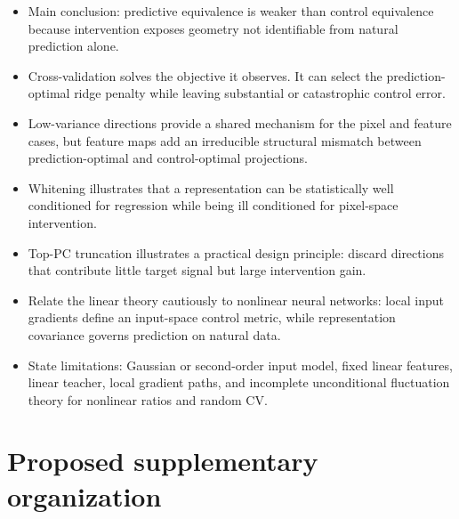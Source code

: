 \documentclass[11pt]{article}
\begin{document}
\begin{itemize}
  \item Main conclusion: predictive equivalence is weaker than control
        equivalence because intervention exposes geometry not identifiable
        from natural prediction alone.
  \item Cross-validation solves the objective it observes. It can select the
        prediction-optimal ridge penalty while leaving substantial or
        catastrophic control error.
  \item Low-variance directions provide a shared mechanism for the pixel and
        feature cases, but feature maps add an irreducible structural mismatch
        between prediction-optimal and control-optimal projections.
  \item Whitening illustrates that a representation can be statistically
        well conditioned for regression while being ill conditioned for
        pixel-space intervention.
  \item Top-PC truncation illustrates a practical design principle: discard
        directions that contribute little target signal but large intervention
        gain.
  \item Relate the linear theory cautiously to nonlinear neural networks:
        local input gradients define an input-space control metric, while
        representation covariance governs prediction on natural data.
  \item State limitations: Gaussian or second-order input model, fixed linear
        features, linear teacher, local gradient paths, and incomplete
        unconditional fluctuation theory for nonlinear ratios and random CV.
\end{itemize}

\section*{Proposed supplementary organization}
\end{document}
